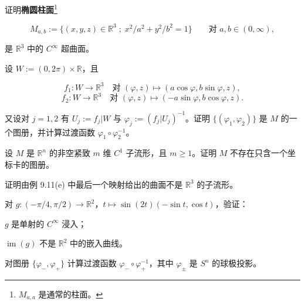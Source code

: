\begin{exercises}
\begin{items}
\item

证明\textbf{椭圆柱面}\footnote{$ M_{a,a} $ 是通常的柱面。}

\[
M_{a,b} := \{ (x, y, z) \in \mathbb{R}^{3} \;;\; x^{2}/a^{2} + y^{2}/b^{2} = 1 \} \qquad \text{对 } a, b \in (0, \infty) ,
\]

是 $ \mathbb{R}^{3} $ 中的 $ C^{\infty} $ 超曲面。

\item

设 $ W := (0, 2\pi) \times \mathbb{R} $，且

\[
f_{1} : W \to \mathbb{R}^{3} \quad \text{对 } (\varphi, z) \mapsto (a\cos\varphi, b\sin\varphi, z) ,
\]
\[
f_{2} : W \to \mathbb{R}^{3} \quad \text{对 } (\varphi, z) \mapsto (-a\sin\varphi, b\cos\varphi, z) .
\]

又设对 $ j = 1, 2 $ 有 $ U_{j} := f_{j}|W $ 与 $ \varphi_{j} := (f_{j}|U_{j})^{-1} $。证明 $ \{(\varphi_{1}, \varphi_{2})\} $ 是 $ M $ 的一个图册，并计算过渡函数 $ \varphi_{1} \circ \varphi_{2}^{-1} $。

\end{items}

\item

设 $ M $ 是 $ \mathbb{R}^{n} $ 的非空紧致 $ m $ 维 $ C^{1} $ 子流形，且 $ m \ge 1 $。证明 $ M $ 不存在只含一个坐标卡的图册。

\item

证明由例 9.11(e) 中最后一个映射给出的曲面不是 $ \mathbb{R}^{3} $ 的子流形。

\item

对 $ g : (-\pi/4, \pi/2) \to \mathbb{R}^{2} $，$ t \mapsto \sin(2t)(-\sin t, \cos t) $，验证：

\begin{items}
\item

$ g $ 是单射的 $ C^{\infty} $ 浸入；

\item

$ \operatorname{im}(g) $ 不是 $ \mathbb{R}^{2} $ 中的嵌入曲线。

\end{items}

\item

对图册 $ \{\varphi_{-}, \varphi_{+}\} $ 计算过渡函数 $ \varphi_{-} \circ \varphi_{+}^{-1} $，其中 $ \varphi_{\pm} $ 是 $ S^{n} $ 的球极投影。


\end{exercises}
